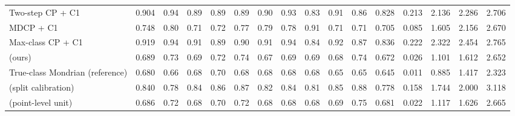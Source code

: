 \begin{table}[!htbp]
{\begin{tabular}{lccccccccccccccc}
Two-step CP + C1 & 0.904 & 0.94 & 0.89 & 0.89 & 0.89 & 0.90 & 0.93 & 0.83 & 0.91 & 0.86 & 0.828 & 0.213 & 2.136 & 2.286 & 2.706 \\
MDCP + C1 & 0.748 & 0.80 & 0.71 & 0.72 & 0.77 & 0.79 & 0.78 & 0.91 & 0.71 & 0.71 & 0.705 & 0.085 & 1.605 & 2.156 & 2.670 \\
Max-class CP + C1 & 0.919 & 0.94 & 0.91 & 0.89 & 0.90 & 0.91 & 0.94 & 0.84 & 0.92 & 0.87 & 0.836 & 0.222 & 2.322 & 2.454 & 2.765 \\
\gamut{} (ours) & 0.689 & 0.73 & 0.69 & 0.72 & 0.74 & 0.67 & 0.69 & 0.69 & 0.68 & 0.74 & 0.672 & 0.026 & 1.101 & 1.612 & 2.652 \\
True-class Mondrian (reference) & 0.680 & 0.66 & 0.68 & 0.70 & 0.68 & 0.68 & 0.68 & 0.68 & 0.65 & 0.65 & 0.645 & 0.011 & 0.885 & 1.417 & 2.323 \\
\gamut{} (split calibration) & 0.840 & 0.78 & 0.84 & 0.86 & 0.87 & 0.82 & 0.84 & 0.81 & 0.85 & 0.88 & 0.778 & 0.158 & 1.744 & 2.000 & 3.118 \\
\gamut{} (point-level unit) & 0.686 & 0.72 & 0.68 & 0.70 & 0.72 & 0.68 & 0.68 & 0.68 & 0.69 & 0.75 & 0.681 & 0.022 & 1.117 & 1.626 & 2.665 \\
\bottomrule
\end{tabular}}
\end{table}
\FloatBarrier

